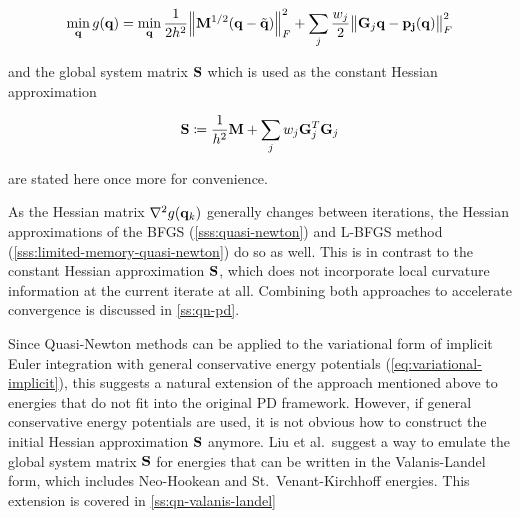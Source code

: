 \begin{equation}\label{eq:pd-minimization-q2}
    \min_{\mathbf{q}} g(\mathbf{q}) = 
    \min_{\mathbf{q}} \frac{1}{2h^2} \norm{\mathbf{M}^{1/2}(\mathbf{q} - \tilde{\mathbf{q}})}^2_F + \sum_j \frac{w_j}{2} \norm{\mathbf{G}_j\mathbf{q}
    - \mathbf{p_j}(\mathbf{q})}^2_F
\end{equation}

\noindent and the global system matrix $\mathbf{S}$ which is used as the constant Hessian approximation

\begin{equation}\label{eq:global-matrix}
    \mathbf{S} \coloneqq \frac{1}{h^2}\mathbf{M} + \sum_j w_j \mathbf{G}_j^T \mathbf{G}_j  
\end{equation}

\noindent are stated here once more for convenience.

As the Hessian matrix $\nabla^2 g(\mathbf{q}_k)$ generally changes between iterations, the Hessian approximations of the 
BFGS (\cref{sss:quasi-newton}) and L-BFGS method (\cref{sss:limited-memory-quasi-newton}) do so as well.
This is in contrast to the constant Hessian approximation $\mathbf{S}$, which does not incorporate local curvature information
at the current iterate at all. Combining both approaches to accelerate convergence is discussed 
in \cref{ss:qn-pd}.

Since Quasi-Newton methods can be applied to the variational form of 
implicit Euler integration with general conservative energy potentials (\cref{eq:variational-implicit}), this suggests a 
natural extension of the approach mentioned above to energies that do not fit into the original PD framework. However,
if general conservative energy potentials are used, it is not obvious how to construct the initial Hessian approximation
$\mathbf{S}$ anymore. Liu et al.\ suggest a way to emulate the global system matrix $\mathbf{S}$ for energies that can be written in
the Valanis-Landel form, which includes Neo-Hookean and St.\ Venant-Kirchhoff energies. This extension is covered in 
\cref{ss:qn-valanis-landel}

